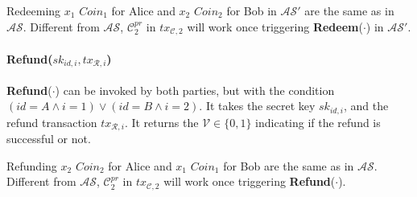 Redeeming $x_1$ $Coin_1$ for Alice and $x_2$ $Coin_2$ for Bob in $\mathcal{AS}'$ are the same as in $\mathcal{AS}$.
Different from $\mathcal{AS}$, $\mathcal{C}^{pr}_2$ in $tx_{\mathcal{C}, 2}$ will work once triggering \textbf{Redeem}($\cdot$) in $\mathcal{AS}'$.

\paragraph{\textbf{Refund}($sk_{id, i}, tx_{\mathcal{R}, i}$)}
\textbf{Refund}($\cdot$) can be invoked by both parties, but with the condition $(id = A \wedge i = 1) \vee (id = B \wedge i = 2)$.
It takes the secret key $sk_{id, i}$,
and the refund transaction $tx_{\mathcal{R}, i}$.
It returns the $\mathcal{V} \in \{0, 1\}$ indicating if the refund is successful or not.

Refunding $x_2$ $Coin_2$ for Alice and $x_1$ $Coin_1$ for Bob are the same as in $\mathcal{AS}$.
Different from $\mathcal{AS}$, $\mathcal{C}^{pr}_2$ in $tx_{\mathcal{C}, 2}$ will work once triggering \textbf{Refund}($\cdot$).